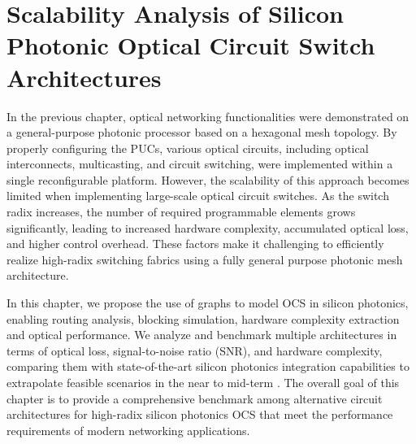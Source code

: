 \chapter[Scalability Analysis of Silicon Photonic OCS Architectures]{
  Scalability Analysis of Silicon Photonic Optical Circuit Switch Architectures
 }\label{chap:ocs_archs} %
In the previous chapter, optical networking functionalities were demonstrated on a general-purpose photonic processor based on a hexagonal mesh topology.
By properly configuring the PUCs, various optical circuits, including optical interconnects, multicasting, and circuit switching, were implemented within a single reconfigurable platform.
However, the scalability of this approach becomes limited when implementing large-scale optical circuit switches.
As the switch radix increases, the number of required programmable elements grows significantly, leading to increased hardware complexity, accumulated optical loss, and higher control overhead.
These factors make it challenging to efficiently realize high-radix switching fabrics using a fully general purpose photonic mesh architecture.

In this chapter, we propose the use of graphs to model OCS in silicon photonics, enabling routing analysis, blocking simulation, hardware complexity extraction and optical performance.
We analyze and benchmark multiple architectures in terms of optical loss, signal-to-noise ratio (SNR), and hardware complexity, comparing them with state-of-the-art silicon photonics integration capabilities to extrapolate feasible scenarios in the near to mid-term \cite{perez2025large, giewont300mmMonolithicSilicon2019}.
The overall goal of this chapter is to provide a comprehensive benchmark among alternative circuit architectures for high-radix silicon photonics OCS that meet the performance requirements of modern networking applications.
